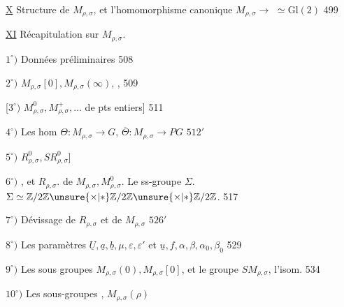 \uline{X} Structure de \(M_{\rho,\sigma}\), et l'homomorphisme canonique
\(M_{\rho,\sigma}\longrightarrow\) \(\simeq\mathrm{Gl}(2)\) \hfill 499

\uline{XI} Récapitulation sur \(M_{\rho,\sigma}\).
\hfill {}


\(1^{\circ})\) Données préliminaires \hfill 508

\(2^{\circ})\) 
\(M_{\rho,\sigma}[0],M_{\rho,\sigma}(\infty)\),
,
\hfill {} 509

[\(3^{\circ})\) \(M_{\rho,\sigma}^{0},M_{\rho,\sigma}^{+},\ldots\)
 de pts entiers] \hfill 511

\(4^{\circ})\) Les hom \(\Theta:M_{\rho,\sigma}\longrightarrow G\),
\(\overline\Theta:M_{\rho,\sigma}\longrightarrow PG\) \hfill \(512'\)

\(5^{\circ})\) \(R_{\rho,\sigma}^{0},SR_{\rho,\sigma}^{0}\)] \hfill {}

\uline{\(6^{\circ})\)} ,  et \(R_{\rho,\sigma}\).
 de \(M_{\rho,\sigma},M_{\rho,\sigma}^{0}\).
Le ss-groupe \(\Sigma\).
\(\Sigma\simeq\mathbb Z/2\mathbb Z\unsure{\times|*}\mathbb Z/2\mathbb Z\unsure{\times|*}\mathbb Z/2\mathbb Z\).
\hfill {} 517

\uline{\(7^{\circ})\)} Dévissage de \(R_{\rho,\sigma}\) et de \(M_{\rho,\sigma}\) \hfill \(526'\)

\(8^{\circ})\) Les paramètres
\(\underline U,\underline a,\underline b,\mu,\varepsilon,\varepsilon'\) et
\(\underline u,f,\alpha,\beta,\alpha_0,\beta_0\)
 \hfill 529

\(9^{\circ})\) Les sous groupes \(M_{\rho,\sigma}(0),M_{\rho,\sigma}[0]\), et le groupe
\(SM_{\rho,\sigma}\), l'isom.  \hfill 534

\(10^{\circ})\) Les sous-groupes 
, \(M_{\rho,\sigma}(\rho)\) \hfill {}

